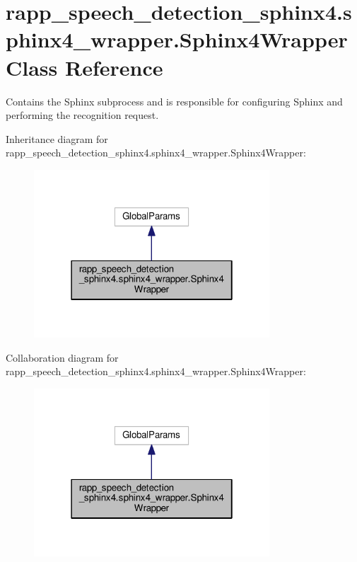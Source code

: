 \hypertarget{classrapp__speech__detection__sphinx4_1_1sphinx4__wrapper_1_1Sphinx4Wrapper}{\section{rapp\-\_\-speech\-\_\-detection\-\_\-sphinx4.\-sphinx4\-\_\-wrapper.\-Sphinx4\-Wrapper Class Reference}
\label{classrapp__speech__detection__sphinx4_1_1sphinx4__wrapper_1_1Sphinx4Wrapper}
}


Contains the Sphinx subprocess and is responsible for configuring Sphinx and performing the recognition request.  




Inheritance diagram for rapp\-\_\-speech\-\_\-detection\-\_\-sphinx4.\-sphinx4\-\_\-wrapper.\-Sphinx4\-Wrapper\-:
\nopagebreak
\begin{figure}[H]
\begin{center}
\leavevmode
\includegraphics[width=250pt]{classrapp__speech__detection__sphinx4_1_1sphinx4__wrapper_1_1Sphinx4Wrapper__inherit__graph}
\end{center}
\end{figure}


Collaboration diagram for rapp\-\_\-speech\-\_\-detection\-\_\-sphinx4.\-sphinx4\-\_\-wrapper.\-Sphinx4\-Wrapper\-:
\nopagebreak
\begin{figure}[H]
\begin{center}
\leavevmode
\includegraphics[width=250pt]{classrapp__speech__detection__sphinx4_1_1sphinx4__wrapper_1_1Sphinx4Wrapper__coll__graph}
\end{center}
\end{figure}
